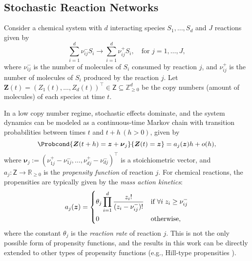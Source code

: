\subsection{Stochastic Reaction Networks}
\label{subsec:SRNs}
Consider a chemical system with $d$ interacting species $S_1, \dots, S_d$ and $J$ reactions given by 
\begin{equation}
    \sum_{i=1}^{d} \nu_{ij}^{-} S_i \longrightarrow \sum_{i=1}^{d} \nu_{ij}^{+} S_i, \quad \text{for } j = 1, \dots, J, 
\end{equation}
where $\nu_{ij}^{-}$ is the number of molecules of $S_i$ consumed by reaction $j$, and $\nu_{ij}^{+}$ is the number of molecules of $S_i$ produced by the reaction $j$. Let $\boldsymbol{Z}(t) = \left( Z_1(t), \dots, Z_d(t) \right)^\top \in \mathsf{Z} \subseteq \mathbb{Z}_{\geq 0}^d$ be the copy numbers (amount of molecules) of each species at time $t$.

In a low copy number regime, stochastic effects dominate, and the system dynamics can be modeled as a continuous-time Markov chain \cite{Gillespie1976, Gillespie1992DerivationCME} with transition probabilities between times $t$ and $t+h \, (h>0)$, given by
\begin{equation}
    \Probcond{ \boldsymbol{Z}(t+h) = \boldsymbol{z} + \boldsymbol{\nu}_j }{ \boldsymbol{Z}(t) = \boldsymbol{z} } = a_j (\boldsymbol{z})h + o(h), 
\end{equation}
where $\boldsymbol{\nu}_j := \left( \nu_{1j}^{+} - \nu_{1j}^{-}, \dots,  \nu_{dj}^{+} - \nu_{dj}^{-}  \right)^\top$ is a stoichiometric vector, and $a_j: \mathsf{Z} \to \mathbb{R}_{\geq 0}$ is the \textit{propensity function} of reaction $j$. For chemical reactions, the propensities are typically given by the \textit{mass action kinetics}: 
\begin{equation}
    \label{eq:mass_action}
    a_j (\boldsymbol{z}) = 
    \begin{dcases}
        \theta_j \prod_{i=1}^{d} \frac{z_i !}{(z_i - \nu_{ij}^{-})!} & \text{if } \forall i \; z_i \geq \nu_{ij}^{-} \\
        0 & \text{otherwise,} \\
    \end{dcases} 
\end{equation}
where the constant $\theta_j$ is the \textit{reaction rate} of reaction $j$. This is not the only possible form of propensity functions, and the results in this work can be directly extended to other types of propensity functions (e.g., Hill-type propensities \cite{murray2002mathematical}).


